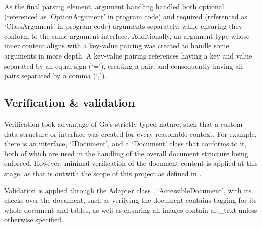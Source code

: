 As the final parsing element, argument handling handled both optional (referenced as `OptionArgument' in program code) and required (referenced as `ClassArgument' in program code) arguments separately, while ensuring they conform to the same argument interface. Additionally, an argument type whose inner content aligns with a key-value pairing was created to handle some arguments in more depth. A key-value pairing references having a key and value separated by an equal sign (`='), creating a pair, and consequently having all pairs separated by a comma (`,').

\subsection{Verification \& validation}
Verification took advantage of Go's strictly typed nature, such that a custom data structure or interface was created for every reasonable context. For example, there is an interface, `IDocument', and a `Document' class that conforms to it, both of which are used in the handling of the overall document structure being enforced. However, minimal verification of the document content is applied at this stage, as that is outwith the scope of this project as defined in .

Validation is applied through the Adapter class \parencite{adapter_design_pattern}, `AccessibleDocument', with its checks over the document, such as verifying the document contains tagging for its whole document and tables, as well as ensuring all images contain \gls{alt_text} unless otherwise specified.